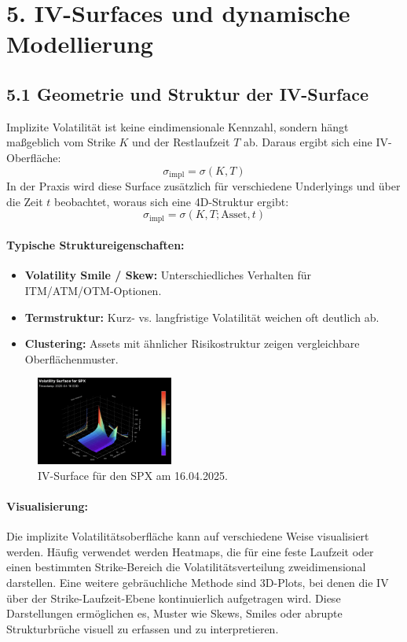 \documentclass[a4paper,12pt]{article}
\begin{document}
\section*{5. IV-Surfaces und dynamische Modellierung}

\subsection*{5.1 Geometrie und Struktur der IV-Surface}

Implizite Volatilität ist keine eindimensionale Kennzahl, sondern hängt maßgeblich vom Strike $K$ und der Restlaufzeit $T$ ab. Daraus ergibt sich eine IV-Oberfläche:
\[
\sigma_{\text{impl}} = \sigma(K, T)
\]
In der Praxis wird diese Surface zusätzlich für verschiedene Underlyings und über die Zeit $t$ beobachtet, woraus sich eine 4D-Struktur ergibt:
\[
\sigma_{\text{impl}} = \sigma(K, T; \text{Asset}, t)
\]

\paragraph{Typische Struktureigenschaften:}
\begin{itemize}
  \item \textbf{Volatility Smile / Skew:} Unterschiedliches Verhalten für ITM/ATM/OTM-Optionen.
  \item \textbf{Termstruktur:} Kurz- vs. langfristige Volatilität weichen oft deutlich ab.
  \item \textbf{Clustering:} Assets mit ähnlicher Risikostruktur zeigen vergleichbare Oberflächenmuster.
\end{itemize}


\begin{figure}
  \centering
  \vspace{-1em}
  \includegraphics[width=0.4\textwidth]{VS3d.png}
  \caption{IV-Surface für den SPX am 16.04.2025.}
  \vspace{-1em}
\end{figure}

\paragraph{Visualisierung:}
Die implizite Volatilitätsoberfläche kann auf verschiedene Weise visualisiert werden. Häufig verwendet werden Heatmaps, die für eine feste Laufzeit oder einen bestimmten Strike-Bereich die Volatilitätsverteilung zweidimensional darstellen. Eine weitere gebräuchliche Methode sind 3D-Plots, bei denen die IV über der Strike-Laufzeit-Ebene kontinuierlich aufgetragen wird. Diese Darstellungen ermöglichen es, Muster wie Skews, Smiles oder abrupte Strukturbrüche visuell zu erfassen und zu interpretieren.
\clearpage
\end{document}
